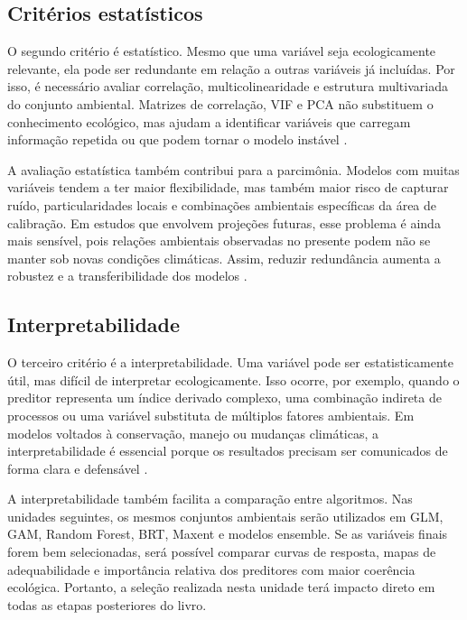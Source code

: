 \subsection{Critérios estatísticos}

O segundo critério é estatístico. Mesmo que uma variável seja ecologicamente relevante, ela pode ser redundante em relação a outras variáveis já incluídas. Por isso, é necessário avaliar correlação, multicolinearidade e estrutura multivariada do conjunto ambiental. Matrizes de correlação, VIF e PCA não substituem o conhecimento ecológico, mas ajudam a identificar variáveis que carregam informação repetida ou que podem tornar o modelo instável \parencite{dormann2013collinearity,guisan2017habitat}.

A avaliação estatística também contribui para a parcimônia. Modelos com muitas variáveis tendem a ter maior flexibilidade, mas também maior risco de capturar ruído, particularidades locais e combinações ambientais específicas da área de calibração. Em estudos que envolvem projeções futuras, esse problema é ainda mais sensível, pois relações ambientais observadas no presente podem não se manter sob novas condições climáticas. Assim, reduzir redundância aumenta a robustez e a transferibilidade dos modelos \parencite{araujo2005validation,zurell2020standard}.

\subsection{Interpretabilidade}

O terceiro critério é a interpretabilidade. Uma variável pode ser estatisticamente útil, mas difícil de interpretar ecologicamente. Isso ocorre, por exemplo, quando o preditor representa um índice derivado complexo, uma combinação indireta de processos ou uma variável substituta de múltiplos fatores ambientais. Em modelos voltados à conservação, manejo ou mudanças climáticas, a interpretabilidade é essencial porque os resultados precisam ser comunicados de forma clara e defensável \parencite{elith2009species,franklin2010mapping}.

A interpretabilidade também facilita a comparação entre algoritmos. Nas unidades seguintes, os mesmos conjuntos ambientais serão utilizados em GLM, GAM, Random Forest, BRT, Maxent e modelos ensemble. Se as variáveis finais forem bem selecionadas, será possível comparar curvas de resposta, mapas de adequabilidade e importância relativa dos preditores com maior coerência ecológica. Portanto, a seleção realizada nesta unidade terá impacto direto em todas as etapas posteriores do livro.


